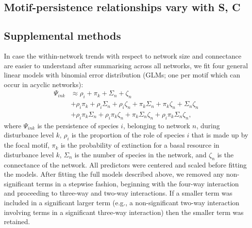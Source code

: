 \documentclass[12pt]{article}
\begin{document}
\begin{spacing}{2.0}
    		
\clearpage



\section{Motif-persistence relationships vary with S, C}

    \subsection{Supplemental methods}
    
        In case the within-network trends with respect to network size and connectance are easier to understand after summarising across all networks, we fit four general linear models with binomial error distribution (GLMs; one per motif which can occur in acyclic networks): 
             \begin{equation}
             \begin{aligned}
            \Psi_{ink} & \approx \rho_{i} + \pi_{k} + \Sigma_{n} + \zeta_{n} \\
            & + \rho_{i}\pi_{k} + \rho_{i}\Sigma_{n} + \rho_{i}\zeta_{n} + \pi_{k}\Sigma_{n} + \pi_{k}\zeta_{n} + \Sigma_{n}\zeta_{n} \\
            & + \rho_{i}\pi_{k}\Sigma_{n} + \rho_{i}\pi_{k}\zeta_{n} + \pi_{k}\Sigma_{n}\zeta_{n} + \rho_{i}\pi_{k}\Sigma_{n}\zeta_{n} ,
            \label{propreq}
            \end{aligned}
            \end{equation}
            \noindent where $\Psi_{ink}$ is the persistence of species $i$, belonging to network $n$, during disturbance level $k$, $\rho_{i}$ is the proportion of the role of species $i$ that is made up by the focal motif, $\pi_k$ is the probability of extinction for a basal resource in disturbance level $k$, $\Sigma_{n}$ is the number of species in the network, and $\zeta_{n}$ is the connectance of the network.
            All predictors were centered and scaled before fitting the models.    
            After fitting the full models described above, we removed any non-significant terms in a stepwise fashion, beginning with the four-way interaction and proceeding to three-way and two-way interactions.
            If a smaller term was included in a significant larger term (e.g., a non-significant two-way interaction involving terms in a significant three-way interaction) then the smaller term was retained.


\end{spacing}
\end{document}

